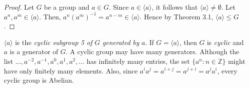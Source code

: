 \documentclass{article}
\theoremstyle{definition}
\begin{document}
    \begin{proof}
        Let $G$ be a group and $a \in G$. Since $a \in \langle a \rangle$, it follows that $\langle a \rangle \neq \emptyset$. Let $a^n,a^m \in \langle a \rangle$. Then, $a^n(a^m)^{-1} = a^{n-m} \in \langle a \rangle$. Hence by Theorem 3.1, $\langle a \rangle \leq G$.
    \end{proof}
    
    $\langle a \rangle$ is the \textit{cyclic subgroup 5 of $G$ generated by $a$}. If $G = \langle a \rangle$, then $G$ is \textit{cyclic} and $a$ is a generator of $G$. A cyclic group may have many generators. Although the list $\dots,a^{-2},a^{-1},a^0,a^1,a^2,\dots$ has infinitely many entries, the set $\{a^n: n \in \mathbb{Z}\}$ might have only finitely many elements. Also, since $a^ia^j=a^{i+j}=a^{j+i}=a^ja^i$, every cyclic group is Abelian.
    
\end{document}
